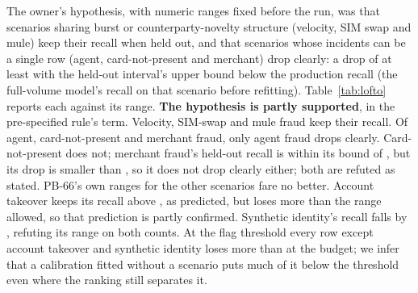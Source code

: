 The owner's hypothesis, with numeric ranges fixed before the run, was that scenarios sharing
burst or counterparty-novelty structure (velocity, SIM swap and mule) keep their recall when held out,
and that scenarios whose incidents can be a single row (agent, card-not-present and merchant) drop clearly: a drop of at least
\nLoRangeSingleDrop{} with the held-out interval's upper bound below the production recall (the full-volume model's
recall on that scenario before refitting).
Table~\ref{tab:lofto} reports each against its range. \textbf{The hypothesis is partly supported}, in the pre-specified rule's term.
Velocity, SIM-swap and mule fraud keep their recall. Of agent, card-not-present and merchant fraud, only agent fraud drops
clearly. Card-not-present does not; merchant fraud's held-out recall is within its bound of
\nLoRangeSingle{}, but its drop is smaller than \nLoRangeSingleDrop{}, so it does not drop clearly
either; both are refuted as stated. PB-66's own ranges for the other scenarios fare no better.
Account takeover keeps its recall above \nLoRangeAto{}, as predicted, but loses more than the range
allowed, so that prediction is partly confirmed. Synthetic identity's recall falls by
\nLoSynDrop{}, refuting its range on both counts. At the flag threshold every row except account
takeover and synthetic identity loses more than at the budget; we infer that a calibration fitted
without a scenario puts much of it below the threshold even where the ranking still separates it.

